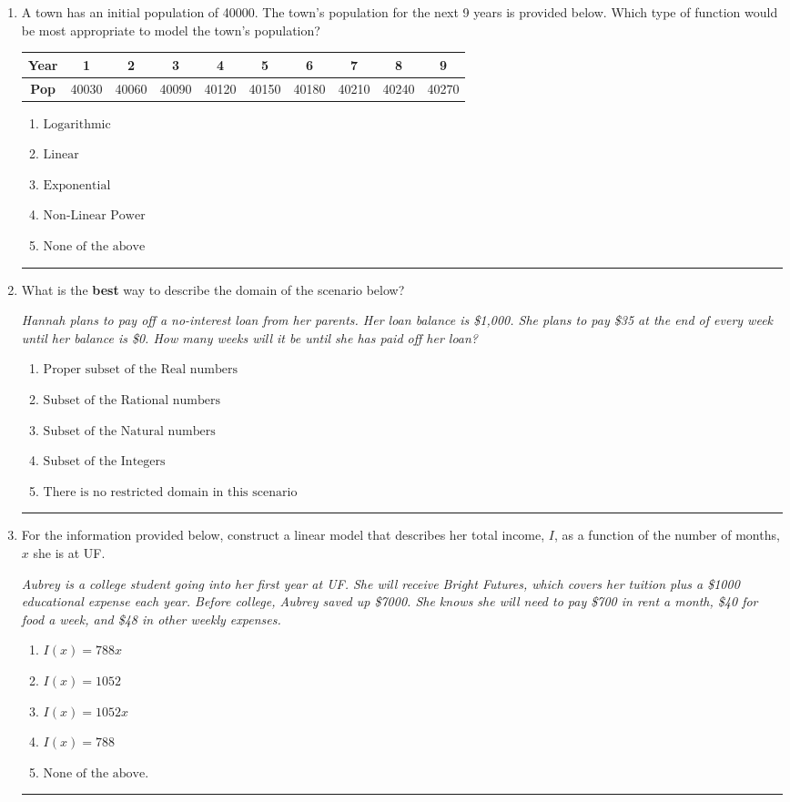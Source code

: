 \documentclass[14pt]{extbook}
\newcommand{\litem}[1]{\item#1\hspace*{-1cm}\rule{\textwidth}{0.4pt}}
\begin{document}
\begin{enumerate}
{\begin{enumerate}[label=\Alph*.]
\end{enumerate} }
\litem{
A town has an initial population of 40000. The town's population for the next 9 years is provided below. Which type of function would be most appropriate to model the town's population?

\begin{tabular}{c|c|c|c|c|c|c|c|c|c}
\textbf{Year} &1 &2 &3 &4 &5 &6 &7 &8 &9\tabularnewline \hline
\textbf{Pop} &40030 &40060 &40090 &40120 &40150 &40180 &40210 &40240 &40270\end{tabular}\begin{enumerate}[label=\Alph*.]
\item \( \text{Logarithmic} \)
\item \( \text{Linear} \)
\item \( \text{Exponential} \)
\item \( \text{Non-Linear Power} \)
\item \( \text{None of the above} \)

\end{enumerate} }
\litem{
What is the \textbf{best} way to describe the domain of the scenario below?
\begin{center}
    \textit{ Hannah plans to pay off a no-interest loan from her parents. Her loan balance is \$1,000. She plans to pay \$35 at the end of every week until her balance is \$0. How many weeks will it be until she has paid off her loan? }
\end{center}
\begin{enumerate}[label=\Alph*.]
\item \( \text{Proper subset of the Real numbers} \)
\item \( \text{Subset of the Rational numbers} \)
\item \( \text{Subset of the Natural numbers} \)
\item \( \text{Subset of the Integers} \)
\item \( \text{There is no restricted domain in this scenario} \)

\end{enumerate} }
\litem{
For the information provided below, construct a linear model that describes her total income, $I$, as a function of the number of months, $x$ she is at UF.
\begin{center}
    \textit{ Aubrey is a college student going into her first year at UF. She will receive Bright Futures, which covers her tuition plus a \$1000 educational expense each year. Before college, Aubrey saved up \$7000. She knows she will need to pay \$700 in rent a month, \$40 for food a week, and \$48 in other weekly expenses. }
\end{center}
\begin{enumerate}[label=\Alph*.]
\item \( I(x) = 788 x \)
\item \( I(x) = 1052 \)
\item \( I(x) = 1052 x \)
\item \( I(x) = 788 \)
\item \( \text{None of the above.} \)


\end{enumerate}}
\end{enumerate}
\end{document}
